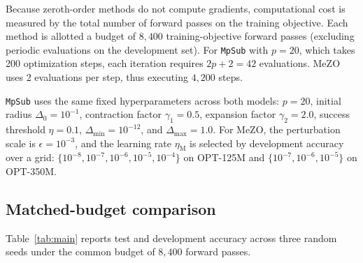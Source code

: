 \documentclass[smallextended]{svjour3}
\begin{document}
Because zeroth-order methods do not compute gradients, computational cost is measured by the total number of forward passes on the training objective. Each method is allotted a budget of $8{,}400$ training-objective forward passes (excluding periodic evaluations on the development set). For \texttt{MpSub} with $p = 20$, which takes 200 optimization steps, each iteration requires $2p + 2 = 42$ evaluations. MeZO uses 2 evaluations per step, thus executing $4{,}200$ steps.

\texttt{MpSub} uses the same fixed hyperparameters across both models: $p = 20$, initial radius $\Delta_0 = 10^{-1}$, contraction factor $\gamma_1 = 0.5$, expansion factor $\gamma_2 = 2.0$, success threshold $\eta = 0.1$, $\Delta_{\min} = 10^{-12}$, and $\Delta_{\max} = 1.0$. For MeZO, the perturbation scale is $\epsilon = 10^{-3}$, and the learning rate $\eta_{\mathrm{M}}$ is selected by development accuracy over a grid: $\{10^{-8}, 10^{-7}, 10^{-6}, 10^{-5}, 10^{-4}\}$ on OPT-125M and $\{10^{-7}, 10^{-6}, 10^{-5}\}$ on OPT-350M.

\subsection{Matched-budget comparison}
\label{subsec:main}

Table~\ref{tab:main} reports test and development accuracy across three random seeds under the common budget of $8{,}400$ forward passes.
\end{document}
